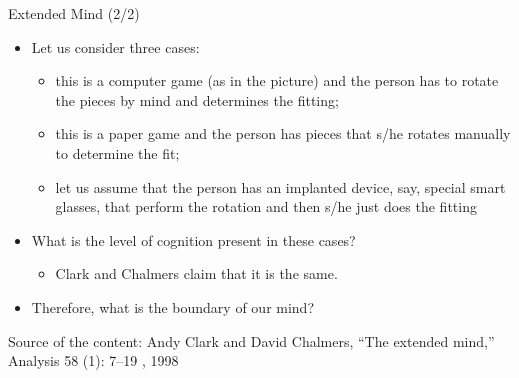 \documentclass{beamer}
\begin{document}
\begin{frame}
{\centerline{Extended Mind (2/2)}}
\begin{itemize}
    \item Let us consider three cases:
    \begin{itemize}
        \item this is a computer game (as in the picture) and the person has to rotate the pieces by mind and determines the fitting;
        \item this is a paper game and the person has pieces that s/he rotates manually to determine the fit;
        \item let us assume that the person has an implanted device, say, special smart glasses, that perform the rotation and then s/he just does the fitting
    \end{itemize}
    \item What is the level of cognition present in these cases?
        \begin{itemize}
   		 \item Clark and Chalmers claim that it is the same.
        \end{itemize}
    \item Therefore, what is the boundary of our mind?
\end{itemize} 
\begin{center}
    \tiny{Source of the content: Andy Clark and David Chalmers, ``The extended mind,'' Analysis 58 (1): 7--19 , 1998}
\end{center}

\end{frame}
\end{document}
